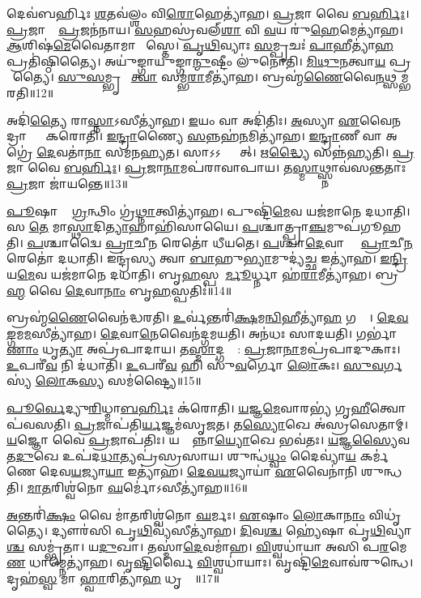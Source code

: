 𑌦𑍇𑌵॑𑌬𑌰𑍍\mbox{}𑌹𑌿𑌃 \ul{𑌶}𑌤𑌵॑𑌲𑍍\mbox{}\ul{𑌶𑌂} 𑌵𑌿\ul{𑌰𑍋}𑌹𑍇𑌤𑍍𑌯𑌾॑𑌹।
\ul{𑌪𑍍𑌰}𑌜𑌾 𑌵𑍈 \ul{𑌬}\ul{𑌰𑍍}𑌹𑌿𑌃।
\ul{𑌪𑍍𑌰}𑌜𑌾𑌨𑌾𑌂᳚ \ul{𑌪𑍍𑌰}𑌜𑌨॑𑌨𑌾𑌯।
\ul{𑌸}𑌹𑌸𑍍𑌰॑𑌵𑌲𑍍‌\ul{𑌶𑌾} 𑌵𑌿 \ul{𑌵}𑌯 𑌰𑍁॑\ul{𑌹𑍇}𑌮𑍇𑌤𑍍𑌯𑌾॑𑌹।
\ul{𑌆}𑌶𑌿𑌷॑\ul{𑌮𑍇}𑌵𑍈𑌤𑌾𑌮𑌾 𑌶𑌾᳚𑌸𑍍𑌤𑍇।
\ul{𑌪𑍃}\ul{𑌥𑌿}𑌵𑍍𑌯𑌾𑌃 \ul{𑌸}𑌮𑍍𑌪𑍃𑌚𑌃॑ \ul{𑌪𑌾}𑌹𑍀𑌤𑍍𑌯𑌾॑\ul{𑌹} 𑌪𑍍𑌰𑌤𑌿॑\-𑌷𑍍𑌠𑌿𑌤𑍍𑌯𑍈।
𑌅𑌯𑍁॑𑌙𑍍𑌗𑌾𑌯𑍁𑌙𑍍𑌗𑌾\ul{𑌨𑍍𑌮𑍁}𑌷𑍍𑌟𑍀𑌂 𑌲𑍁॑𑌨𑍋𑌤𑌿।
\ul{𑌮𑌿}\ul{𑌥𑍁}\ul{𑌨}𑌤𑍍𑌵𑌾\ul{𑌯} 𑌪𑍍𑌰𑌜𑌾᳚𑌤𑍍𑌯𑍈।
\ul{𑌸𑍁}\ul{𑌸}𑌮𑍍𑌭𑍃𑌤𑌾᳚ \ul{𑌤𑍍𑌵𑌾} 𑌸𑌮𑍍𑌭॑\ul{𑌰𑌾}𑌮𑍀𑌤𑍍𑌯𑌾॑𑌹।
𑌬𑍍𑌰𑌹𑍍𑌮॑\ul{𑌣𑍈}𑌵𑍈\ul{𑌨}𑌥𑍍𑌸𑌮𑍍𑌭॑𑌰𑌤𑌿॥12॥

𑌅𑌦𑌿॑\ul{𑌤𑍍𑌯𑍈} 𑌰𑌾\ul{𑌸𑍍𑌨𑌾}\-𑌽𑌸𑍀𑌤𑍍𑌯𑌾॑𑌹।
\ul{𑌇}𑌯𑌂 𑌵𑌾 𑌅𑌦𑌿॑𑌤𑌿𑌃।
\ul{𑌅}𑌸𑍍𑌯𑌾 \ul{𑌏}𑌵𑍈\ul{𑌨}𑌦𑍍𑌰𑌾𑌸𑍍𑌨𑌾𑌂᳚ 𑌕𑌰𑍋𑌤𑌿।
\ul{𑌇}\ul{𑌨𑍍𑌦𑍍𑌰𑌾}𑌣𑍍𑌯𑍈 \ul{𑌸}𑌨𑍍𑌨𑌹॑\ul{𑌨}𑌮𑌿𑌤𑍍𑌯𑌾॑𑌹।
\ul{𑌇}\ul{𑌨𑍍𑌦𑍍𑌰𑌾}𑌣𑍀 𑌵𑌾 𑌅𑌗𑍍𑌰𑍇॑ \ul{𑌦𑍇}𑌵𑌤𑌾॑\ul{𑌨𑌾}\ul{} 𑌸𑌮॑𑌨𑌹𑍍𑌯𑌤।
𑌸𑌾𑌽𑌽𑌰𑍍𑌧𑍍𑌨𑍋᳚𑌤𑍍।
𑌋\ul{𑌦𑍍𑌧𑍍𑌯𑍈} 𑌸𑌨𑍍𑌨॑𑌹𑍍𑌯𑌤𑌿।
\ul{𑌪𑍍𑌰}𑌜𑌾 𑌵𑍈 \ul{𑌬}\ul{𑌰𑍍}𑌹𑌿𑌃।
\ul{𑌪𑍍𑌰}𑌜𑌾\ul{𑌨𑌾}𑌮𑌪॑𑌰𑌾𑌵𑌾𑌪𑌾𑌯।
𑌤\ul{𑌸𑍍𑌮𑌾}𑌥𑍍𑌸𑍍𑌨𑌾𑌵॑𑌸𑌨𑍍𑌤𑌤𑌾𑌃 \ul{𑌪𑍍𑌰}𑌜𑌾 𑌜𑌾॑𑌯𑌨𑍍𑌤𑍇॥13॥

\ul{𑌪𑍂}𑌷𑌾 𑌤𑍇᳚ \ul{𑌗𑍍𑌰}𑌨𑍍𑌥𑌿𑌂 𑌗𑍍𑌰॑\ul{𑌥𑍍𑌨𑌾}𑌤𑍍𑌵𑌿𑌤𑍍𑌯𑌾॑𑌹।
𑌪𑍁𑌷𑍍𑌟𑌿॑\ul{𑌮𑍇}𑌵 𑌯𑌜॑𑌮𑌾𑌨𑍇 𑌦𑌧𑌾𑌤𑌿।
𑌸 \ul{𑌤𑍇} 𑌮𑌾\ul{𑌸𑍍𑌥𑌾}𑌦𑌿\ul{𑌤𑍍𑌯𑌾}𑌹𑌾𑌹𑌿॑𑌸𑌾𑌯𑍈।
\ul{𑌪}𑌶𑍍𑌚𑌾𑌤𑍍𑌪𑍍𑌰𑌾\ul{𑌞𑍍𑌚}𑌮𑍁𑌪॑𑌗𑍂𑌹𑌤𑌿।
\ul{𑌪}𑌶𑍍𑌚𑌾𑌦𑍍𑌵𑍈 \ul{𑌪𑍍𑌰𑌾}𑌚𑍀\ul{𑌨}\ul{} 𑌰𑍇𑌤𑍋॑ 𑌧𑍀𑌯𑌤𑍇।
\ul{𑌪}𑌶𑍍𑌚𑌾\ul{𑌦𑍇}𑌵𑌾𑌸𑍍𑌮𑍈᳚ \ul{𑌪𑍍𑌰𑌾}𑌚𑍀\ul{𑌨}\ul{} 𑌰𑍇𑌤𑍋॑ 𑌦𑌧𑌾𑌤𑌿।
𑌇𑌨𑍍𑌦𑍍𑌰॑𑌸𑍍𑌯 𑌤𑍍𑌵𑌾 \ul{𑌬𑌾}𑌹𑍁\ul{𑌭𑍍𑌯𑌾}𑌮𑍁𑌦𑍍𑌯॑\ul{𑌚𑍍𑌛} 𑌇𑌤𑍍𑌯𑌾॑𑌹।
\ul{𑌇}\ul{𑌨𑍍𑌦𑍍𑌰𑌿}𑌯\ul{𑌮𑍇}𑌵 𑌯𑌜॑𑌮𑌾𑌨𑍇 𑌦𑌧𑌾𑌤𑌿।
𑌬𑍃\ul{𑌹}𑌸𑍍𑌪𑌤𑍇᳚\ul{𑌰𑍍𑌮𑍂}𑌰𑍍𑌧𑍍𑌨𑌾 𑌹॑\ul{𑌰𑌾}𑌮𑍀𑌤𑍍𑌯𑌾॑𑌹।
𑌬𑍍𑌰\ul{𑌹𑍍𑌮} 𑌵𑍈 \ul{𑌦𑍇}𑌵𑌾\ul{𑌨𑌾𑌂} 𑌬𑍃\ul{𑌹}𑌸𑍍𑌪𑌤𑌿𑌃॑॥14॥

𑌬𑍍𑌰𑌹𑍍𑌮॑\ul{𑌣𑍈}𑌵𑍈𑌨॑𑌦𑍍𑌧𑌰𑌤𑌿।
\ul{𑌉}𑌰𑍍𑌵॑𑌨𑍍𑌤𑌰𑌿॑\ul{𑌕𑍍𑌷}𑌮\ul{𑌨𑍍𑌵𑌿}𑌹𑍀𑌤𑍍𑌯𑌾॑\ul{𑌹} 𑌗𑌤𑍍𑌯𑍈᳚।
\ul{𑌦𑍇}\ul{𑌵}\ul{𑌙𑍍𑌗}𑌮\ul{𑌮}𑌸𑍀\-𑌤𑍍𑌯𑌾॑𑌹।
\ul{𑌦𑍇}𑌵𑌾\ul{𑌨𑍇}𑌵𑍈𑌨॑𑌦𑍍𑌗𑌮𑌯𑌤𑌿।
𑌅𑌨॑𑌧𑌃 𑌸𑌾𑌦𑌯𑌤𑌿।
𑌗𑌰𑍍𑌭𑌾॑\ul{𑌣𑌾𑌂} 𑌧𑍃\ul{𑌤𑍍𑌯𑌾} 𑌅𑌪𑍍𑌰॑𑌪𑌾𑌦𑌾𑌯।
𑌤\ul{𑌸𑍍𑌮𑌾}𑌦𑍍𑌗𑌰𑍍𑌭𑌾᳚: \ul{𑌪𑍍𑌰}𑌜𑌾\ul{𑌨𑌾}𑌮𑌪𑍍𑌰॑𑌪𑌾𑌦𑍁𑌕𑌾𑌃।
\ul{𑌉}𑌪𑌰𑍀॑\ul{𑌵} 𑌨𑌿 𑌦॑𑌧𑌾𑌤𑌿।
\ul{𑌉}𑌪𑌰𑍀॑\ul{𑌵} 𑌹𑌿 𑌸𑍁॑\ul{𑌵}𑌰𑍍𑌗𑍋 \ul{𑌲𑍋}𑌕𑌃।
\ul{𑌸𑍁}\ul{𑌵}𑌰𑍍𑌗𑌸𑍍𑌯॑ \ul{𑌲𑍋}𑌕\ul{𑌸𑍍𑌯} 𑌸𑌮॑𑌷𑍍𑌟𑍍𑌯𑍈॥15॥\anuvakamend[\ul{𑌸}\ul{𑌯𑍋}\ul{𑌨𑌿}𑌤𑍍𑌵𑌾𑌯॑ \ul{𑌸𑍍𑌵}𑌧𑌾𑌕𑍃॑\ul{𑌤𑌾}\-𑌽𑌸𑍀𑌤𑍍𑌯𑌾॑𑌹 𑌦𑌾\ul{𑌯𑌾}𑌦𑍍𑌵𑍇𑌦॑ 𑌭𑌰𑌤𑌿 𑌜𑌾𑌯\ul{𑌨𑍍𑌤𑍇} 𑌬𑍃\ul{𑌹}𑌸𑍍𑌪\ul{𑌤𑌿𑌃} 𑌸𑌮॑𑌷𑍍𑌟𑍍𑌯𑍈]

\ul{𑌪𑍂}\ul{𑌰𑍍𑌵𑍇}𑌦𑍍𑌯𑍁\ul{𑌰𑌿}𑌧𑍍𑌮𑌾\ul{𑌬}\ul{𑌰𑍍}𑌹𑌿𑌃 𑌕॑𑌰𑍋𑌤𑌿।
\ul{𑌯}𑌜𑍍𑌞\ul{𑌮𑍇}𑌵𑌾𑌰𑌭𑍍𑌯॑ 𑌗𑍃\ul{𑌹𑍀}𑌤𑍍𑌵𑍋𑌪॑𑌵𑌸𑌤𑌿।
\ul{𑌪𑍍𑌰}𑌜𑌾𑌪॑𑌤𑌿\ul{𑌰𑍍𑌯}𑌜𑍍𑌞𑌮॑𑌸𑍃𑌜𑌤।
𑌤\ul{𑌸𑍍𑌯𑍋}𑌖𑍇 𑌅॑𑌸𑍍𑌰𑌸𑍇𑌤𑌾𑌮𑍍।
\ul{𑌯}𑌜𑍍𑌞𑍋 𑌵𑍈 \ul{𑌪𑍍𑌰}𑌜𑌾𑌪॑𑌤𑌿𑌃।
𑌯𑌥𑍍𑌸𑌾᳚𑌨𑍍𑌨𑌾\ul{𑌯𑍍𑌯𑍋}𑌖𑍇 𑌭𑌵॑𑌤𑌃।
\ul{𑌯}𑌜𑍍𑌞\ul{𑌸𑍍𑌯𑍈}𑌵 𑌤\ul{𑌦𑍁}𑌖𑍇 𑌉𑌪॑𑌦\ul{𑌧𑌾}𑌤𑍍𑌯𑌪𑍍𑌰॑𑌸𑍍𑌰𑌸𑌾𑌯।
𑌶𑍁𑌨𑍍𑌧॑\ul{𑌧𑍍𑌵𑌂} 𑌦𑍈𑌵𑍍𑌯𑌾॑\ul{𑌯} 𑌕𑌰𑍍𑌮॑𑌣𑍇 𑌦𑍇𑌵\ul{𑌯}𑌜𑍍𑌯𑌾\ul{𑌯𑌾} 𑌇𑌤𑍍𑌯𑌾॑𑌹।
\ul{𑌦𑍇}\ul{𑌵}\ul{𑌯}𑌜𑍍𑌯𑌾𑌯𑌾॑ \ul{𑌏}𑌵𑍈𑌨𑌾॑𑌨𑌿 𑌶𑍁𑌨𑍍𑌧𑌤𑌿।
\ul{𑌮𑌾}\ul{𑌤}𑌰𑌿𑌶𑍍𑌵॑𑌨𑍋 \ul{𑌘}𑌰𑍍𑌮𑍋॑\-𑌽𑌸𑍀𑌤𑍍𑌯𑌾॑𑌹॥16॥

\ul{𑌅}𑌨𑍍𑌤𑌰𑌿॑\ul{𑌕𑍍𑌷𑌂} 𑌵𑍈 𑌮𑌾॑\ul{𑌤}𑌰𑌿𑌶𑍍𑌵॑𑌨𑍋 \ul{𑌘}𑌰𑍍𑌮𑌃।
\ul{𑌏}𑌷𑌾𑌂 \ul{𑌲𑍋}𑌕𑌾\ul{𑌨𑌾𑌂} 𑌵𑌿𑌧𑍃॑𑌤𑍍𑌯𑍈।
𑌦𑍍𑌯𑍗𑌰॑𑌸𑌿 𑌪𑍃\ul{𑌥𑌿}𑌵𑍍𑌯॑𑌸𑍀𑌤𑍍𑌯𑌾॑𑌹।
\ul{𑌦𑌿}𑌵\ul{𑌶𑍍𑌚} 𑌹𑍍𑌯𑍇॑𑌷𑌾 𑌪𑍃॑\ul{𑌥𑌿}𑌵𑍍𑌯𑌾\ul{𑌶𑍍𑌚} 𑌸𑌮𑍍𑌭𑍃॑𑌤𑌾।
𑌯\ul{𑌦𑍁}𑌖𑌾।
𑌤𑌸𑍍𑌮𑌾॑\ul{𑌦𑍇}𑌵𑌮𑌾॑𑌹।
\ul{𑌵𑌿}𑌶𑍍𑌵𑌧𑌾॑𑌯𑌾 𑌅𑌸𑌿 𑌪\ul{𑌰}𑌮𑍇\ul{𑌣} 𑌧𑌾𑌮𑍍𑌨𑍇𑌤𑍍𑌯𑌾॑𑌹।
𑌵𑍃\ul{𑌷𑍍𑌟𑌿}𑌰𑍍𑌵𑍈 \ul{𑌵𑌿}𑌶𑍍𑌵𑌧𑌾॑𑌯𑌾𑌃।
𑌵𑍃𑌷𑍍𑌟𑌿॑\ul{𑌮𑍇}𑌵𑌾𑌵॑𑌰𑍁𑌨𑍍𑌧𑍇।
𑌦𑍃𑌹॑\ul{𑌸𑍍𑌵} 𑌮𑌾 \ul{𑌹𑍍𑌵𑌾}𑌰𑌿𑌤𑍍𑌯𑌾॑\ul{𑌹} 𑌧𑍃𑌤𑍍𑌯𑍈᳚॥17॥

